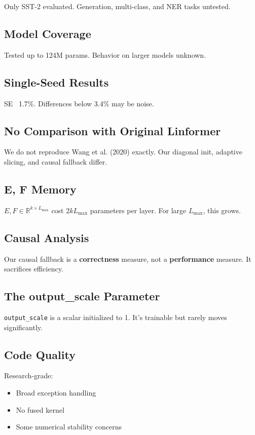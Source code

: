 Only SST-2 evaluated. Generation, multi-class, and NER tasks untested.

\subsection{Model Coverage}

Tested up to 124M params. Behavior on larger models unknown.

\subsection{Single-Seed Results}

SE ~1.7\%. Differences below 3.4\% may be noise.

\subsection{No Comparison with Original Linformer}

We do not reproduce Wang et al. (2020) exactly. Our diagonal init, adaptive 
slicing, and causal fallback differ.

\subsection{E, F Memory}

$E, F \in \mathbb{R}^{k \times L_\text{max}}$ cost $2 k L_\text{max}$ 
parameters per layer. For large $L_\text{max}$, this grows.

\subsection{Causal Analysis}

Our causal fallback is a \textbf{correctness} measure, not a \textbf{performance} 
measure. It sacrifices efficiency.

\subsection{The output\_scale Parameter}

\texttt{output\_scale} is a scalar initialized to 1. It's trainable but rarely 
moves significantly.

\subsection{Code Quality}

Research-grade:
\begin{itemize}
\item Broad exception handling
\item No fused kernel
\item Some numerical stability concerns

\end{itemize}
